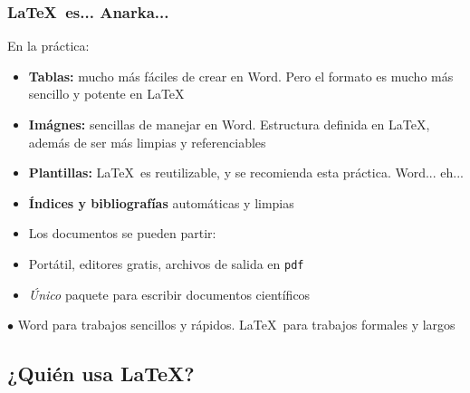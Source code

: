 \documentclass{beamer}
\begin{document}
\begin{frame}[fragile]
\frametitle{\LaTeX\ es... Anarka...}
En la práctica:
\begin{itemize}
	\item \textbf{Tablas:} mucho más fáciles de crear en Word. Pero el formato es mucho más sencillo y potente en \LaTeX
	\item \textbf{Imágnes:} sencillas de manejar en Word. Estructura definida en \LaTeX, además de ser más limpias y referenciables 
	\item \textbf{Plantillas:} \LaTeX\ es reutilizable, y se recomienda esta práctica. Word... eh...
	\item \textbf{Índices y bibliografías} automáticas y limpias
	\item Los documentos se pueden partir: \verb||
	\item Portátil, editores gratis, archivos de salida en \texttt{pdf}
	\item \textit{Único} paquete para escribir documentos científicos
\end{itemize}
$\bullet$ Word para trabajos sencillos y rápidos. \LaTeX\ para trabajos formales y largos
\end{frame}

\subsection{¿Quién usa \LaTeX?}
\end{document}
